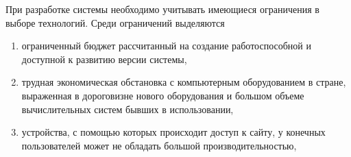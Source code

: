 При разработке системы необходимо учитывать имеющиеся ограничения в выборе технологий. Среди ограничений выделяются
\begin{enumerate}
    \item ограниченный бюджет рассчитанный на создание работоспособной и доступной к развитию версии системы, %
    
    \item трудная экономическая обстановка с компьютерным оборудованием в стране, выраженная в дороговизне нового оборудования и большом объеме вычислительных систем бывших в использовании, %
    
    \item устройства, с помощью которых происходит доступ к сайту, у конечных пользователей может не обладать большой производительностью,
    
\end{enumerate}

    



